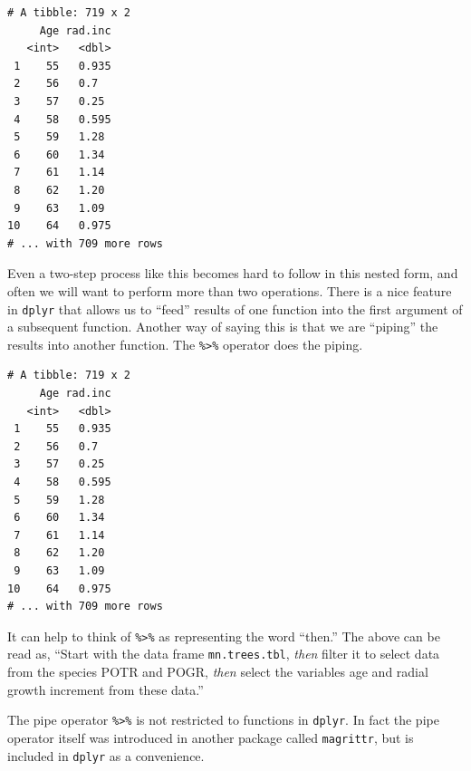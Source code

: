 \documentclass[]{krantz}
\makeatletter
\newenvironment{Shaded}{\begin{snugshade}}{\end{snugshade}}
\newcommand{\KeywordTok}[1]{\textcolor[rgb]{0.27,0.27,0.27}{\textbf{#1}}}
\newcommand{\NormalTok}[1]{#1}
\newcommand{\OperatorTok}[1]{\textcolor[rgb]{0.43,0.43,0.43}{\textbf{#1}}}
\newcommand{\StringTok}[1]{\textcolor[rgb]{0.5,0.5,0.5}{#1}}
\newenvironment{kframe}{%
\medskip{}
\setlength{\fboxsep}{.8em}
 \def\at@end@of@kframe{}%
 \ifinner\ifhmode%
  \def\at@end@of@kframe{\end{minipage}}%
  \begin{minipage}{\columnwidth}%
 \fi\fi%
 \def\FrameCommand##1{\hskip\@totalleftmargin \hskip-\fboxsep
 \colorbox{shadecolor}{##1}\hskip-\fboxsep
     \hskip-\linewidth \hskip-\@totalleftmargin \hskip\columnwidth}%
 \MakeFramed {\advance\hsize-\width
   \@totalleftmargin\z@ \linewidth\hsize
   \@setminipage}}%
 {\par\unskip\endMakeFramed%
 \at@end@of@kframe}
\renewenvironment{Shaded}{\begin{kframe}}{\end{kframe}}
\makeatother
\begin{document}
\begin{verbatim}
# A tibble: 719 x 2
     Age rad.inc
   <int>   <dbl>
 1    55   0.935
 2    56   0.7  
 3    57   0.25 
 4    58   0.595
 5    59   1.28 
 6    60   1.34 
 7    61   1.14 
 8    62   1.20 
 9    63   1.09 
10    64   0.975
# ... with 709 more rows
\end{verbatim}

Even a two-step process like this becomes hard to follow in this nested form, and often we will want to perform more than two operations. There is a nice feature in \texttt{dplyr} that allows us to ``feed'' results of one function into the first argument of a subsequent function. Another way of saying this is that we are ``piping'' the results into another function. The \texttt{\%\textgreater{}\%} operator does the piping.

\begin{Shaded}
\end{Shaded}

\begin{verbatim}
# A tibble: 719 x 2
     Age rad.inc
   <int>   <dbl>
 1    55   0.935
 2    56   0.7  
 3    57   0.25 
 4    58   0.595
 5    59   1.28 
 6    60   1.34 
 7    61   1.14 
 8    62   1.20 
 9    63   1.09 
10    64   0.975
# ... with 709 more rows
\end{verbatim}

It can help to think of \texttt{\%\textgreater{}\%} as representing the word ``then.'' The above can be read as, ``Start with the data frame \texttt{mn.trees.tbl}, \emph{then} filter it to select data from the species POTR and POGR, \emph{then} select the variables age and radial growth increment from these data.''

The pipe operator \texttt{\%\textgreater{}\%} is not restricted to functions in \texttt{dplyr}. In fact the pipe operator itself was introduced in another package called \texttt{magrittr}, but is included in \texttt{dplyr} as a convenience.
\end{document}
